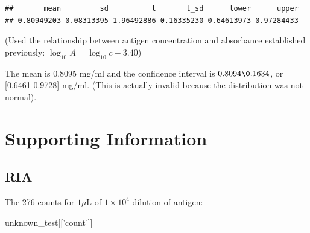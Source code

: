 \documentclass[
]{article}
\newenvironment{Shaded}{\begin{snugshade}}{\end{snugshade}}
\newcommand{\NormalTok}[1]{#1}
\newcommand{\StringTok}[1]{\textcolor[rgb]{0.31,0.60,0.02}{#1}}
\begin{document}
\begin{verbatim}
##       mean         sd          t       t_sd      lower      upper 
## 0.80949203 0.08313395 1.96492886 0.16335230 0.64613973 0.97284433
\end{verbatim}

(Used the relationship between antigen concentration and absorbance established previously: \(\log_{10}{A} = \log_{10}{c} - 3.40\))

The mean is 0.8095 mg/ml and the confidence interval is \(0.8094\0.1634\), or {[}0.6461 0.9728{]} mg/ml. (This is actually invalid because the distribution was not normal).

\hypertarget{supporting-information}{%
\section{Supporting Information}\label{supporting-information}}

\hypertarget{ria}{%
\subsection{RIA}\label{ria}}

The 276 counts for \(1\mu\text{L}\) of \(1\times10^4\) dilution of antigen:

\begin{Shaded}
\begin{Highlighting}[]
\NormalTok{unknown_test[[}\StringTok{'count'}\NormalTok{]]}
\end{Highlighting}
\end{Shaded}
\end{document}
